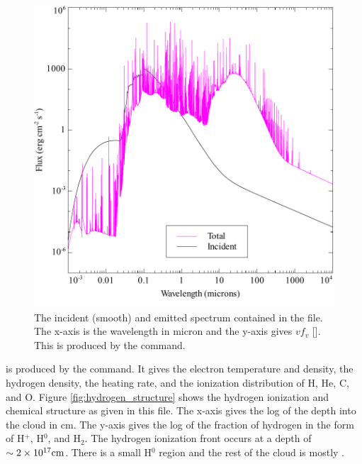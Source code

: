 \documentclass[12pt,twoside]{article}
\begin{document}
{\begin{figure}
\begin{center}
\includegraphics[clip=on,width=0.8\columnwidth,height=0.8\textheight,keepaspectratio]{orion_hii_pdr_pp_con}
\end{center}
\caption{The incident (smooth) and emitted spectrum contained in the
 file.  The
x-axis is the wavelength in micron and
the y-axis gives $vf_v$ [\ergpscmps ].  This is produced by the
 command.}
\label{fig:orion_hii_pdr_pp_con}
\end{figure}

 is produced
by the  command.  It gives
the electron temperature and density, the hydrogen density, the heating
rate, and the ionization distribution of H, He, C, and O.
Figure \ref{fig:hydrogen_structure} shows the hydrogen ionization
and chemical structure as given in this file.
The x-axis gives the log of the depth into the cloud in cm.
The y-axis gives the log of the fraction of hydrogen in the form of H$^+$,
H$^0$, and H$_2$.
The hydrogen ionization
front occurs at a depth of $\sim 2 \times 10^{17} \rm{cm}$.
There is a small H$^0$ region and the rest of the cloud is mostly \htwo .

}
\end{document}
